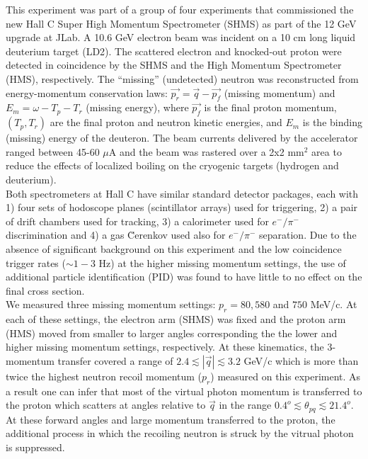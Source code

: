 \indent This experiment was part of a group of four experiments that commissioned the new Hall C Super High Momentum Spectrometer (SHMS) as part of the 12 GeV upgrade at JLab.
A 10.6 GeV electron beam was incident on a 10 cm long liquid deuterium target (LD2). The scattered electron and knocked-out proton were detected in coincidence
by the SHMS and the High Momentum Spectrometer (HMS), respectively. The ``missing'' (undetected) neutron was reconstructed from energy-momentum conservation laws:
$\vec{p_{r}} = \vec{q} - \vec{p_{f}}$ (missing momentum) and $E_{m} = \omega - T_{p} - T_{r}$ (missing energy), where $\vec{p_{f}}$ is the final proton momentum, $(T_{p}, T_{r})$ are the
final proton and neutron kinetic energies, and $E_{m}$ is the binding (missing) energy of the deuteron.
The beam currents delivered by the accelerator ranged between 45-60 $\mu$A and the beam was rastered over a 2x2 mm$^{2}$ area to reduce the effects of localized boiling on the cryogenic targets (hydrogen and deuterium). \\
\indent Both spectrometers at Hall C have similar standard detector packages, each with 1) four sets of hodoscope planes\cite{hodo_techreport} (scintillator arrays) used for triggering,
2) a pair of drift chambers\cite{dc_techreport} used for tracking, 3) a calorimeter\cite{Mkrtchyan_2013} used for $e^{-}/\pi^{-}$ discrimination and 4) a gas \u{C}erenkov \cite{Li_Wenliang_mthesis,ngc_techreport} used also for $e^{-}/\pi^{-}$ separation.
Due to the absence of significant background on this experiment and the low coincidence trigger rates
($\sim 1-3$ Hz) at the higher missing momentum settings, the use of additional particle identification (PID) was found to have little to no effect on the final cross section. \\
\indent We measured three missing momentum settings: $p_{r}=80,580$ and $750$ MeV/c. At each of these settings, the electron arm (SHMS) was fixed and the proton arm (HMS) moved from smaller to larger angles corresponding the
the lower and higher missing momentum settings, respectively. At these kinematics, the 3-momentum transfer covered a range of $2.4\lesssim|\vec{q}|\lesssim3.2$ GeV/c which is more than twice the highest neutron recoil momentum ($p_{r}$)
measured on this experiment. As a result one can infer that most of the virtual photon momentum is transferred to the proton which scatters at angles relative to $\vec{q}$ in the range $0.4^{o}\lesssim \theta_{pq}\lesssim21.4^{o}$.
At these forward angles and large momentum transferred to the proton, the additional process in which the recoiling neutron is struck by the vitrual photon is suppressed. \\
